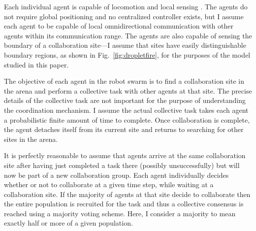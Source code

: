\documentclass[12pt]{book}
\begin{document}
Each individual agent is capable of locomotion \cite{Klingner2014} and local sensing \cite{Farrow2014}. The agents do not require global positioning and no centralized controller exists, but I assume each agent to be capable of local omnidirectional communication with other agents within its communication range. The agents are also capable of sensing the boundary of a collaboration site---I assume that sites have easily distinguishable boundary regions, as shown in Fig.~\ref{fig:dropletfire}, for the purposes of the model studied in this paper. 

The objective of each agent in the robot swarm is to find a collaboration site in the arena and perform a collective task with other agents at that site. The precise details of the collective task are not important for the purpose of understanding the coordination mechanism. I assume the actual collective task takes each agent a probabilistic finite amount of time to complete. Once collaboration is complete, the agent detaches itself from its current site and returns to searching for other sites in the arena. 

It is perfectly reasonable to assume that agents arrive at the same collaboration site after having just completed a task there (possibly unsuccessfully) but will now be part of a new collaboration group. Each agent individually decides whether or not to collaborate at a given time step, while waiting at a collaboration site. If the majority of agents at that site decide to collaborate then the entire population is recruited for the task and thus a collective consensus is reached using a majority voting scheme. Here, I consider a majority to mean exactly half or more of a given population. 
\end{document}
